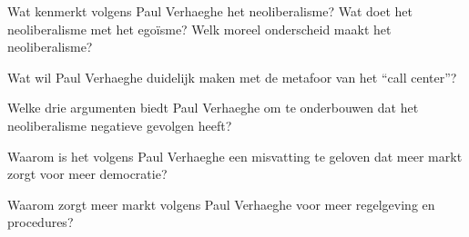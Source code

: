 \documentclass[main.tex]{subfiles}
\begin{document}
\begin{examenvraag}
    \begin{vraag}
        Wat kenmerkt volgens Paul Verhaeghe het neoliberalisme? Wat doet het neoliberalisme met het egoïsme? Welk moreel onderscheid maakt het neoliberalisme?
    \end{vraag}

    \begin{antwoord}
    \end{antwoord}
\end{examenvraag}


\begin{examenvraag}
    \begin{vraag}
        Wat wil Paul Verhaeghe duidelijk maken met de metafoor van het “call center”?
    \end{vraag}

    \begin{antwoord}
    \end{antwoord}
\end{examenvraag}


\begin{examenvraag}
    \begin{vraag}
        Welke drie argumenten biedt Paul Verhaeghe om te onderbouwen dat het neoliberalisme negatieve gevolgen heeft?
    \end{vraag}

    \begin{antwoord}
    \end{antwoord}
\end{examenvraag}


\begin{examenvraag}
    \begin{vraag}
        Waarom is het volgens Paul Verhaeghe een misvatting te geloven dat meer markt zorgt voor meer democratie?
    \end{vraag}

    \begin{antwoord}
    \end{antwoord}
\end{examenvraag}


\begin{examenvraag}
    \begin{vraag}
        Waarom zorgt meer markt volgens Paul Verhaeghe voor meer regelgeving en procedures?
    \end{vraag}

    \begin{antwoord}
    \end{antwoord}
\end{examenvraag}
\end{document}
